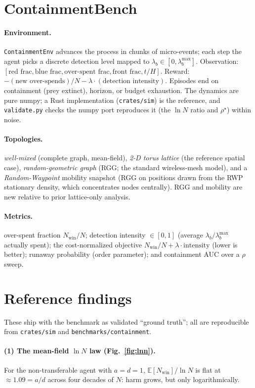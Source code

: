 \documentclass[11pt]{article}
\newcommand{\Nwin}{N_{\mathrm{win}}}
\newcommand{\rhoc}{\rho^\star}
\begin{document}
\section{ContainmentBench}
\paragraph{Environment.} \texttt{ContainmentEnv} advances the process in chunks of
micro-events; each step the agent picks a discrete detection level mapped to
$\lambda_b\in[0,\lambda_b^{\max}]$. Observation: $[\text{red frac},\text{blue
frac},\text{over-spent frac},\text{front frac},t/H]$. Reward: $-(\text{new
over-spends})/N-\lambda\cdot(\text{detection intensity})$. Episodes end on
containment (prey extinct), horizon, or budget exhaustion. The dynamics are pure
numpy; a Rust implementation (\texttt{crates/sim}) is the reference, and
\texttt{validate.py} checks the numpy port reproduces it (the $\ln N$ ratio and
$\rhoc$) within noise.

\paragraph{Topologies.} \emph{well-mixed} (complete graph, mean-field), \emph{2-D
torus lattice} (the reference spatial case), \emph{random-geometric graph} (RGG; the
standard wireless-mesh model), and a \emph{Random-Waypoint} mobility snapshot (RGG on
positions drawn from the RWP stationary density, which concentrates nodes centrally).
RGG and mobility are new relative to prior lattice-only analysis.

\paragraph{Metrics.} over-spent fraction $\Nwin/N$; detection intensity
$\in[0,1]$ (average $\lambda_b/\lambda_b^{\max}$ actually spent); the cost-normalized
objective $\Nwin/N+\lambda\cdot\text{intensity}$ (lower is better); runaway
probability (order parameter); and containment AUC over a $\rho$ sweep.

\section{Reference findings}
These ship with the benchmark as validated ``ground truth''; all are reproducible
from \texttt{crates/sim} and \texttt{benchmarks/containment}.

\paragraph{(1) The mean-field $\ln N$ law (Fig.~\ref{fig:lnn}).} For the
non-transferable agent with $a=d=1$, $\mathbb{E}[\Nwin]/\ln N$ is flat at
${\approx}1.09=a/d$ across four decades of $N$: harm grows, but only logarithmically.
\end{document}
